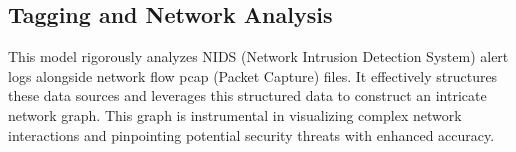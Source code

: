 



\subsection{Tagging and Network Analysis}
This model rigorously analyzes NIDS (Network Intrusion Detection System) alert logs alongside network flow pcap (Packet Capture) files. It effectively structures these data sources and leverages this structured data to construct an intricate network graph. This graph is instrumental in visualizing complex network interactions and pinpointing potential security threats with enhanced accuracy.

